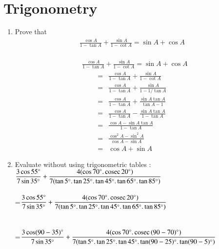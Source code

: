 \documentclass[journal,12pt,twocolumn]{IEEEtran}
\renewcommand\thesection{\arabic{section}}
\begin{document}
 \section{Trigonometry}
 \renewcommand{\theequation}{\theenumi}
\begin{enumerate}[label=\thesection.\arabic*.,ref=\thesection.\theenumi]
\item Prove that
 \begin{align}
 \displaystyle\frac{\cos A}{1-\tan A}+\displaystyle\frac{\sin A}{1-\cot A}=\sin A+\cos A \nonumber
 \end{align}
\solution \\
\begin{align}
& \displaystyle\frac{\cos A}{1-\tan A}+\displaystyle\frac{\sin A}{1-\cot A}=\sin A+\cos A 
\end{align}
\begin{align}
=& \displaystyle\frac{\cos A}{1-\tan A}+\displaystyle\frac{\sin A}{1-\cot A}\\
=& \displaystyle\frac{\cos A}{1-\tan A}+\displaystyle\frac{\sin A}{1-1/\tan A}\\
=& \displaystyle\frac{\cos A}{1-\tan A}+\displaystyle\frac{\sin A \tan A}{\tan A - 1}\\
=& \displaystyle\frac{\cos A}{1-\tan A} - \displaystyle\frac{\sin A \tan A}{1 - \tan A}\\
=& \displaystyle\frac{\cos A - \sin A \tan A}{1-\tan A}\\
=& \displaystyle\frac{\cos^2 A - \sin^2 A }{\cos A-\sin A}\\
=&\cos A+\sin A
\end{align}
\item Evaluate without using trigonometric tables :\\
 \bigskip
 $\displaystyle\frac{3\cos55\degree}{7\sin35\degree}+\displaystyle\frac{4(\cos70\degree.\,\text{cosec}\,20\degree)}{7(\tan5\degree.\tan25\degree.\tan45\degree.\tan65\degree.\tan85\degree)}$
\solution \\ \\
 =$\displaystyle\frac{3\cos55\degree}{7\sin35\degree}+\displaystyle\frac{4(\cos70\degree.\,\text{cosec}\,20\degree)}{7(\tan5\degree.\tan25\degree.\tan45\degree.\tan65\degree.\tan85\degree)}$\\ \\ \\
  =$\displaystyle\frac{3\cos(90- 35)\degree}{7\sin35\degree}+\displaystyle\frac{4(\cos70\degree.\,\text{cosec}\,(90-70)\degree)}{7(\tan5\degree.\tan25\degree.\tan45\degree.\tan(90-25)\degree.\tan(90-5)\degree)}$\\ \\ \\

\end{enumerate}
\end{document}
